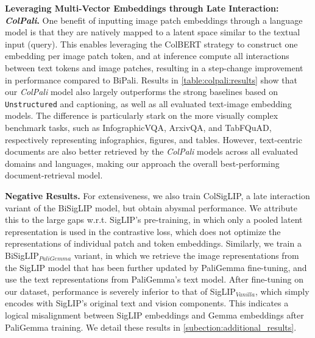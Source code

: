 
\noindent\textbf{Leveraging Multi-Vector Embeddings through Late Interaction: \textit{ColPali}.}
One benefit of inputting image patch embeddings through a language model is that they are natively mapped to a latent space similar to the textual input (query). This enables leveraging the ColBERT strategy to construct one embedding per image patch token, and at inference compute all interactions between text tokens and image patches, resulting in a step-change improvement in performance compared to BiPali. 
Results in \autoref{table:colpali:results} show that our \textit{ColPali} model also largely outperforms the strong baselines based on \texttt{Unstructured} and captioning, as well as all evaluated text-image embedding models. The difference is particularly stark on the more visually complex benchmark tasks, such as InfographicVQA, ArxivQA, and TabFQuAD, respectively representing infographics, figures, and tables. However, text-centric documents are also better retrieved by the \textit{ColPali} models across all evaluated domains and languages, making our approach the overall best-performing document-retrieval model.

\noindent\textbf{Negative Results.} For extensiveness, we also train ColSigLIP, a late interaction variant of the BiSigLIP model, but obtain abysmal performance. We attribute this to the large gaps w.r.t. SigLIP's pre-training, in which only a pooled latent representation is used in the contrastive loss, which does not optimize the representations of individual patch and token embeddings. Similarly, we train a BiSigLIP$_{PaliGemma}$ variant, in which we retrieve the image representations from the SigLIP model that has been further updated by PaliGemma fine-tuning, and use the text representations from PaliGemma's text model. After fine-tuning on our dataset, performance is severely inferior to that of SigLIP$_{Vanilla}$, which simply encodes with SigLIP's original text and vision components. This indicates a logical misalignment between SigLIP embeddings and Gemma embeddings after PaliGemma training. We detail these results in \autoref{subection:additional_results}.

